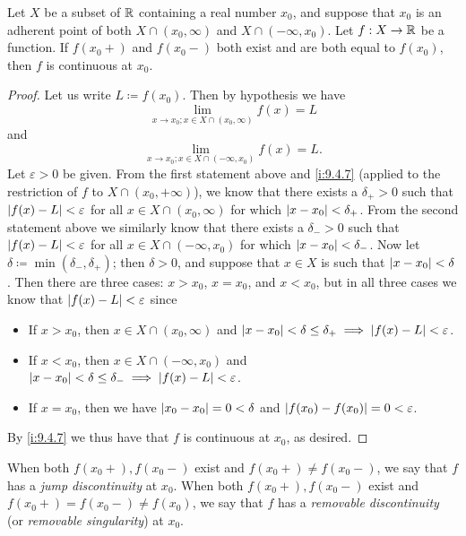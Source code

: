 \setcounter{thm}{2}
\begin{prop}\label{i:9.5.3}
  Let \(X\) be a subset of \(\mathbb{R}\) containing a real number \(x_0\), and suppose that \(x_0\) is an adherent point of both \(X \cap (x_0, \infty)\) and \(X \cap (-\infty, x_0)\).
  Let \(f : X \to \mathbb{R}\) be a function.
  If \(f(x_0+)\) and \(f(x_0-)\) both exist and are both equal to \(f(x_0)\), then \(f\) is continuous at \(x_0\).
\end{prop}

\begin{proof}
  Let us write \(L \coloneqq f(x_0)\).
  Then by hypothesis we have
  \[
    \lim_{x \to x_0 ; x \in X \cap (x_0, \infty)} f(x) = L
  \]
  and
  \[
    \lim_{x \to x_0 ; x \in X \cap (-\infty, x_0)} f(x) = L.
  \]
  Let \(\varepsilon > 0\) be given.
  From the first statement above and \cref{i:9.4.7} (applied to the restriction of \(f\) to \(X \cap (x_0, +\infty)\)), we know that there exists a \(\delta_+ > 0\) such that \(\left\lvert f(x) - L\right\rvert < \varepsilon\) for all \(x \in X \cap(x_0, \infty)\) for which \(\left\lvert x - x_0\right\rvert < \delta_+\).
  From the second statement above we similarly know that there exists a \(\delta_- > 0\) such that \(\left\lvert f(x) - L\right\rvert < \varepsilon\) for all \(x \in X \cap (-\infty, x_0)\) for which \(\left\lvert x - x_0\right\rvert < \delta_-\).
  Now let \(\delta \coloneqq \min(\delta_-, \delta_+)\);
  then \(\delta > 0\), and suppose that \(x \in X\) is such that \(\left\lvert x - x_0\right\rvert < \delta\).
  Then there are three cases:
  \(x > x_0\), \(x = x_0\), and \(x < x_0\), but in all three cases we know that \(\left\lvert f(x) - L\right\rvert < \varepsilon\) since
  \begin{itemize}
    \item If \(x > x_0\), then \(x \in X \cap (x_0, \infty)\) and \(\left\lvert x - x_0\right\rvert < \delta \leq \delta_+ \implies \left\lvert f(x) - L\right\rvert < \varepsilon\).
    \item If \(x < x_0\), then \(x \in X \cap (-\infty, x_0)\) and \(\left\lvert x - x_0\right\rvert < \delta \leq \delta_- \implies \left\lvert f(x) - L\right\rvert < \varepsilon\).
    \item If \(x = x_0\), then we have \(\left\lvert x_0 - x_0\right\rvert = 0 < \delta\) and \(\left\lvert f(x_0) - f(x_0)\right\rvert = 0 < \varepsilon\).
  \end{itemize}
  By \cref{i:9.4.7} we thus have that \(f\) is continuous at \(x_0\), as desired.
\end{proof}

\begin{note}
  When both \(f(x_0+), f(x_0-)\) exist and \(f(x_0+) \neq f(x_0-)\), we say that \(f\) has a \emph{jump discontinuity} at \(x_0\).
  When both \(f(x_0+), f(x_0-)\) exist and \(f(x_0+) = f(x_0-) \neq f(x_0)\), we say that \(f\) has a \emph{removable discontinuity} (or \emph{removable singularity}) at \(x_0\).
\end{note}

